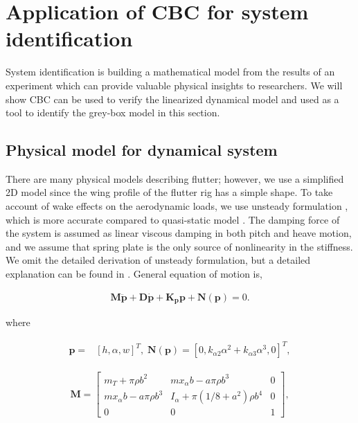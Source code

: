 \documentclass[openacc]{rsproca_new}%
\def\vec#1{\ensuremath{\mathbf{#1}}}
\begin{document}
\section{Application of CBC for system identification}
System identification is building a mathematical model from the results of an experiment which can provide valuable physical insights to researchers. We will show CBC can be used to verify the linearized dynamical model and used as a tool to identify the grey-box model \cite{bohlin2006practical} in this section.

\subsection{Physical model for dynamical system}\label{model}
There are many physical models describing flutter; however, we use a simplified 2D model since the wing profile of the flutter rig has a simple shape. To take account of wake effects on the aerodynamic loads, we use unsteady formulation \cite{abdelkefi2013analytical}, which is more accurate compared to quasi-static model \cite{strganac2000identification}. The damping force of the system is assumed as linear viscous damping in both pitch and heave motion, and we assume that spring plate is the only source of nonlinearity in the stiffness. We omit the detailed derivation of unsteady formulation, but a detailed explanation can be found in \cite{abdelkefi2013analytical}. General equation of motion is,

\begin{align}\label{eq:2-1}
\vec{M} \ddot{\vec{p}} + \vec{D} \dot{\vec{p}} +\vec{K_p} \vec{p} + \vec{N}(\vec{p}) =0.
\end{align}

\noindent where

\begin{align}\label{eq:2-2}
\vec{p}=&[h,\alpha,w]^T, \; \vec{N}(\vec{p})=[0,k_{\alpha 2}\alpha^2+k_{\alpha 3}\alpha^3,0]^T,
\end{align}

\begin{align}\label{eq:2-3}
\vec{M}=
\begin{bmatrix}
    m_T+\pi \rho b^2       & m x_\alpha b-a\pi\rho b^3 & 0 \\
    m x_\alpha b-a\pi\rho b^3       & I_\alpha+\pi(1/8+a^2)\rho b^4 & 0 \\
    0       & 0 & 1
\end{bmatrix},
\end{align}
\end{document}
